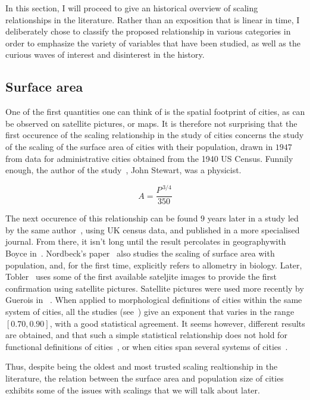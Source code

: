 In this section, I will proceed to give an historical overview of scaling
relationships in the literature. Rather than an exposition that is linear in
time, I deliberately chose to classify the proposed relationship in various
categories in order to emphasize the variety of variables that have been
studied, as well as the curious waves of interest and disinterest in the
history.

\subsection{Surface area}
\label{sub:surface_area}

One of the first quantities one can think of is the spatial footprint of cities,
as can be observed on satellite pictures, or maps. It is therefore not
surprising that the first occurence of the scaling relationship in the study of
cities concerns the study of the scaling of the surface area of cities with
their population, drawn in $1947$ from data for administrative cities obtained
from the 1940 US Census.  Funnily enough, the author of the
study~\cite{Stewart:1947}, John Stewart, was a physicist.

\begin{equation}
    A = \frac{P^{\,3/4}}{350}
\end{equation}

The next occurence of this relationship can be found $9$ years later in a study
led by the same author~\cite{Stewart:1958}, using UK census data, and published
in a more specialised journal. From there, it isn't long until the result
percolates in geographywith Boyce in~\cite{Boyce:1963}.  Nordbeck's
paper~\cite{Nordbeck:1965} also studies the scaling of surface area with
population, and, for the first time, explicitly refers to allometry in biology.
Later, Tobler~\cite{Tobler:1969} uses some of the first available sateljite
images to provide the first confirmation using satellite pictures. Satellite
pictures were used more recently by Guerois in ~\cite{Guerois:2003}. When
applied to morphological definitions of cities within the same system of cities,
all the studies (see~\cite{Batty:2011}) give an exponent that varies in the
range $[0.70, 0.90]$, with a good statistical agreement. It seems however,
different results are obtained, and that such a simple statistical relationship
does not hold for functional definitions of cities~\cite{Batty:2011}, or when
cities span several systems of cities~\cite{Fuller:2009}.

Thus, despite being the oldest and most trusted scaling realtionship in the
literature, the relation between the surface area and population size of cities
exhibits some of the issues with scalings that we will talk about later.

